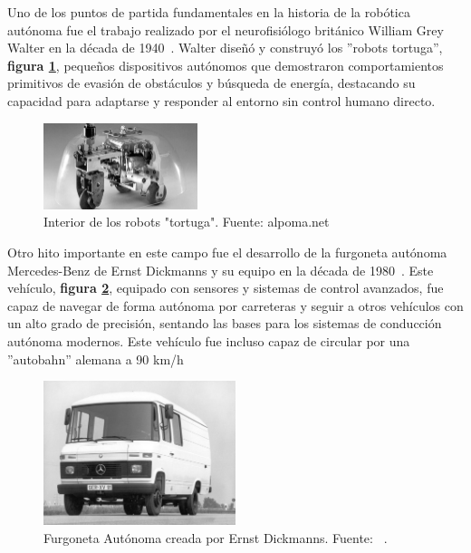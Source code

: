 Uno de los puntos de partida fundamentales en la historia de la robótica autónoma fue el trabajo realizado por el neurofisiólogo británico 
William Grey Walter en la década de 1940~\cite{holland2003first}. Walter diseñó y construyó los ''robots tortuga'', \textbf{figura \ref{fig:tortugas_grey}}, pequeños dispositivos 
autónomos que demostraron comportamientos primitivos de evasión de obstáculos y búsqueda de energía, destacando su capacidad 
para adaptarse y responder al entorno sin control humano directo.

\begin{figure}[h]
    \centering
    \includegraphics[width=0.4\textwidth]{images/tortugas_william_grey.jpg}
    \caption{Interior de los robots "tortuga". Fuente: alpoma.net}
    \label{fig:tortugas_grey}
\end{figure}


Otro hito importante en este campo fue el desarrollo de la furgoneta autónoma Mercedes-Benz de Ernst Dickmanns y su equipo en la década de 
1980~\Cite{ernst80}. Este vehículo, \textbf{figura \ref{fig:furgoneta_ernst}}, equipado con sensores y sistemas de control avanzados, fue capaz de navegar de forma autónoma por 
carreteras y seguir a otros vehículos con un alto grado de precisión, sentando las bases para los sistemas de conducción autónoma modernos. 
Este vehículo fue   incluso capaz de circular por una ''autobahn'' alemana a 90 km/h

\begin{figure}[h]
    \centering
    \includegraphics[width=0.5\textwidth]{images/furgoneta_ernst_dickens.jpeg}
    \caption{Furgoneta Autónoma creada por Ernst Dickmanns. Fuente: ~\cite{ernst80}.}
    \label{fig:furgoneta_ernst}
\end{figure}

